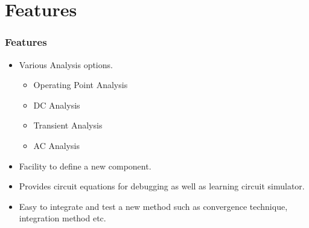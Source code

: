 \documentclass{beamer}
\begin{document}
\section{Features}
\begin{frame}
 \frametitle{Features}
\begin{itemize}
  \item {\color{red} Various Analysis options.}
    \begin{itemize}
      \item Operating Point Analysis
      \item DC Analysis 
      \item Transient Analysis  
      \item AC Analysis 
    \end{itemize}
  \item Facility to define a new component.
  \item Provides circuit equations for debugging as well as learning circuit simulator.
  \item Easy to integrate and test a new method such as convergence technique, integration method etc. 
\end{itemize} 
\end{frame}
\end{document}
